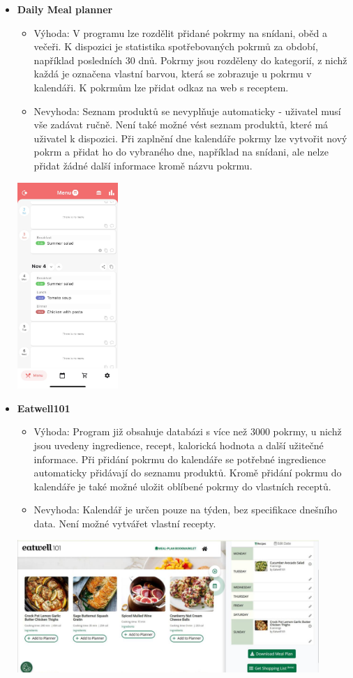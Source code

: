 \documentclass[a4paper,12pt]{article}
\begin{document}
\begin{itemize}
    \item \textbf{Daily Meal planner}
    \begin{itemize}
        \item Výhoda: V programu lze rozdělit přidané pokrmy na snídani, oběd a večeři. K dispozici je statistika spotřebovaných pokrmů za období, například posledních 30 dnů. Pokrmy jsou rozděleny do kategorií, z nichž každá je označena vlastní barvou, která se zobrazuje u pokrmu v kalendáři. K pokrmům lze přidat odkaz na web s receptem.
        \item Nevyhoda: Seznam produktů se nevyplňuje automaticky - uživatel musí vše zadávat ručně. Není také možné vést seznam produktů, které má uživatel k dispozici. Při zaplnění dne kalendáře pokrmy lze vytvořit nový pokrm a přidat ho do vybraného dne, například na snídani, ale nelze přidat žádné další informace kromě názvu pokrmu.
    \end{itemize}
   \begin{center}
        \includegraphics[width=0.3\textwidth]{Meal.jpg}
    \end{center}
    \item \textbf{Eatwell101}
    \begin{itemize}
        \item Výhoda: Program již obsahuje databázi s více než 3000 pokrmy, u nichž jsou uvedeny ingredience, recept, kalorická hodnota a další užitečné informace. Při přidání pokrmu do kalendáře se potřebné ingredience automaticky přidávají do seznamu produktů. Kromě přidání pokrmu do kalendáře je také možné uložit oblíbené pokrmy do vlastních receptů.
        \item Nevyhoda: Kalendář je určen pouze na týden, bez specifikace dnešního data. Není možné vytvářet vlastní recepty.
    \end{itemize}
    \includegraphics[width=0.9\textwidth]{eatwell101.jpg}
    
\end{itemize}
\end{document}
